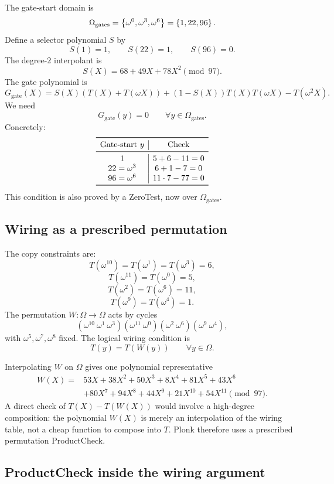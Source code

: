 The gate-start domain is
\[
    \Omega_{\mathrm{gates}}=\left\{\omega^0,\omega^3,\omega^6\right\}=\left\{1,22,96\right\}.
\]
Define a selector polynomial $S$ by
\[
    S(1)=1,
    \qquad
    S(22)=1,
    \qquad
    S(96)=0.
\]
The degree-$2$ interpolant is
\[
    S(X)=68+49X+78X^2\pmod{97}.
\]
The gate polynomial is
\[
    G_{\mathrm{gate}}(X)
    =S(X)(T(X)+T(\omega X))+(1-S(X))T(X)T(\omega X)-T(\omega^2X).
\]
We need
\[
    G_{\mathrm{gate}}(y)=0
    \qquad\forall y\in\Omega_{\mathrm{gates}}.
\]
Concretely:
\[
\begin{array}{c|c}
\toprule
\text{Gate-start }y & \text{Check}\\
\midrule
1 & 5+6-11=0\\
22=\omega^3 & 6+1-7=0\\
96=\omega^6 & 11\cdot7-77=0\\
\bottomrule
\end{array}
\]
This condition is also proved by a ZeroTest, now over $\Omega_{\mathrm{gates}}$.

\subsection{Wiring as a prescribed permutation}

The copy constraints are:
\[
T(\omega^{10})=T(\omega^1)=T(\omega^3)=6,
\]
\[
T(\omega^{11})=T(\omega^0)=5,
\]
\[
T(\omega^2)=T(\omega^6)=11,
\]
\[
T(\omega^9)=T(\omega^4)=1.
\]
The permutation $W:\Omega\to\Omega$ acts by cycles
\[
    (\omega^{10}\ \omega^1\ \omega^3)
    (\omega^{11}\ \omega^0)
    (\omega^2\ \omega^6)
    (\omega^9\ \omega^4),
\]
with $\omega^5,\omega^7,\omega^8$ fixed. The logical wiring condition is
\[
    T(y)=T(W(y))
    \qquad\forall y\in\Omega.
\]

Interpolating $W$ on $\Omega$ gives one polynomial representative
\[
\begin{aligned}
W(X)={}&53X+38X^2+50X^3+8X^4+81X^5+43X^6\\
&+80X^7+94X^8+44X^9+21X^{10}+54X^{11}
\pmod{97}.
\end{aligned}
\]
A direct check of $T(X)-T(W(X))$ would involve a high-degree composition: the polynomial $W(X)$ is merely an interpolation of the wiring table, not a cheap function to compose into $T$. Plonk therefore uses a prescribed permutation ProductCheck.

\subsection{ProductCheck inside the wiring argument}

